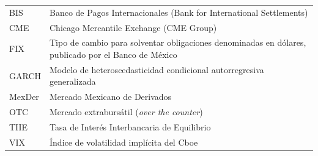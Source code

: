 {\begin{tabular}{@{}p{2.2cm}p{\dimexpr\textwidth-2.2cm-2\tabcolsep}@{}}
BIS & Banco de Pagos Internacionales (Bank for International Settlements)\\
CME & Chicago Mercantile Exchange (CME Group)\\
FIX & Tipo de cambio para solventar obligaciones denominadas en dólares, publicado por el Banco de México\\
GARCH & Modelo de heteroscedasticidad condicional autorregresiva generalizada\\
MexDer & Mercado Mexicano de Derivados\\
OTC & Mercado extrabursátil (\textit{over the counter})\\
TIIE & Tasa de Interés Interbancaria de Equilibrio\\
VIX & Índice de volatilidad implícita del Cboe\\
\end{tabular}\par}
